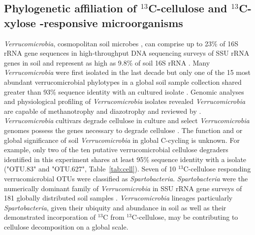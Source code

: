 \subsection{Phylogenetic affiliation of $^{13}$C-cellulose and $^{13}$C-xylose
    -responsive microorganisms}
\textit{Verrucomicrobia}, cosmopolitan soil microbes
\citep{Bergmann_2011}, can comprise up to 23\% of 16S rRNA gene sequences in
high-throughput DNA sequencing surveys of SSU rRNA genes in soil
\citep{Bergmann_2011} and represent as high as 9.8\% of soil 16S rRNA
\citep{Buckley_2001}. Many \textit{Verrucomicrobia} were first isolated in the
last decade \cite{Wertz_2011} but only one of the 15 most abundant
verrucomicrobial phylotypes in a global soil sample collection shared greater
than 93\% sequence identity with an cultured isolate \citep{Bergmann_2011}.
Genomic analyses and physiological profiling of \textit{Verrucomicrobia}
isolates revealed \textit{Verrucomicrobia} are capable of methanotrophy and
diazotrophy \citep{Wertz_2011} and reviewed by \citet{Wertz_2011}.
\textit{Verrucomicrobia} cultivars degrade cellulose in culture and select
\textit{Verrucomicrobia} genomes possess the genes necessary to degrade
cellulose \citep{Otsuka_2012, Wertz_2011}.  The function and or global
significance of soil \textit{Verrucomicrobia} in global C-cycling is unknown.
For example, only two of the ten putative verrucomicrobial cellulose degraders
identified in this experiment shares at least 95\% sequence identity with
a isolate ("OTU.83" and "OTU.627", Table~\ref{tab:cell}). Seven of 10
$^{13}$C-cellulose responding verrucomicrobial OTUs were classified as
\textit{Spartobacteria}. \textit{Spartobacteria} were the numerically dominant
family of \textit{Verrucomicrobia} in SSU rRNA gene surveys of 181 globally
distributed soil samples \citep{Bergmann_2011}. \textit{Verrucomicrobia}
lineages particularly \textit{Spartobacteria}, given their ubiquity and
abundance in soil as well as their demonstrated incorporation of $^{13}$C from
$^{13}$C-cellulose, may be contributing to cellulose decomposition on a global
scale.

